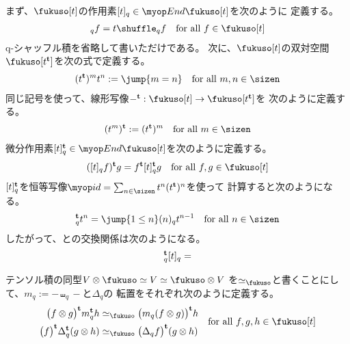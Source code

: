 {	まず、$\fukuso[t]$の作用素$[t]_q\in\End\fukuso[t]$を次のように
	定義する。
	\begin{equation*}\begin{split}
		[t]_qf = t\shuffle_qf \quad\text{for all } f\in\fukuso[t]
	\end{split}\end{equation*}
	q-シャッフル積を省略して書いただけである。
	次に、$\fukuso[t]$の双対空間$\fukuso[t^\tran]$を次の式で定義する。
	\begin{equation*}\begin{split}
		(t^\tran)^mt^n := \jump{m = n} \quad\text{for all } m,n\in\sizen
	\end{split}\end{equation*}
	同じ記号を使って、線形写像$-^\tran:\fukuso[t]\to\fukuso[t^\tran]$を
	次のように定義する。
	\begin{equation*}\begin{split}
		(t^m)^\tran := (t^\tran)^m \quad\text{for all } m\in\sizen
	\end{split}\end{equation*}
	微分作用素$[t]_q^\tran\in\End\fukuso[t]$を次のように定義する。
	\begin{equation*}\begin{split}
		([t]_qf)^\tran g = f^\tran [t]_q^\tran g
		\quad\text{for all } f,g\in\fukuso[t]
	\end{split}\end{equation*}
	$[t]_q^{\mathbf{t}}$を恒等写像$\id=\sum_{n\in\sizen}t^n(t^\tran)^n$を使って
	計算すると次のようになる。
	\begin{equation*}\begin{split}
		[t]_q^\tran t^n = \jump{1\le n} (n)_qt^{n-1}
		\quad\text{for all } n\in\sizen
	\end{split}\end{equation*}
	したがって、との交換関係は次のようになる。
	\begin{equation*}\begin{split}
		[t]_q^{\mathbf{t}}[t]_q = 
	\end{split}\end{equation*}

	テンソル積の同型$V\otimes\fukuso\simeq V\simeq \fukuso\otimes V$
	を$\simeq_\fukuso$と書くことにして、$m_q:=-\shuffle_q-$と$\Delta_q$の
	転置をそれぞれ次のように定義する。
	\begin{equation*}\begin{split}
		\bigl(f\otimes g\bigr)^\tran m_q^\tran h
		&\simeq_\fukuso \bigl(m_q(f\otimes g)\bigr)^\tran h \\
		\bigl(f\bigr)^\tran \Delta_q^\tran(g\otimes h)
		&\simeq_\fukuso \bigl(\Delta_qf\bigr)^\tran (g\otimes h) \\
	\end{split}
	\quad\text{for all } f,g,h\in\fukuso[t]
	\end{equation*}

}

